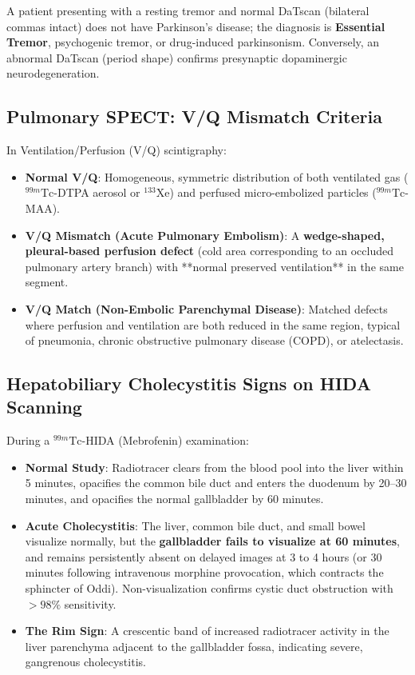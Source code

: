 \documentclass[11pt,a4paper]{article}
\begin{document}
\begin{clinicalpearl}
A patient presenting with a resting tremor and normal DaTscan (bilateral commas intact) does not have Parkinson's disease; the diagnosis is \textbf{Essential Tremor}, psychogenic tremor, or drug-induced parkinsonism. Conversely, an abnormal DaTscan (period shape) confirms presynaptic dopaminergic neurodegeneration.
\end{clinicalpearl}

\subsection{Pulmonary SPECT: V/Q Mismatch Criteria}
In Ventilation/Perfusion (V/Q) scintigraphy:
\begin{itemize}
    \item \textbf{Normal V/Q}: Homogeneous, symmetric distribution of both ventilated gas ($^{99m}\text{Tc}$-DTPA aerosol or $^{133}\text{Xe}$) and perfused micro-embolized particles ($^{99m}\text{Tc}$-MAA).
    \item \textbf{V/Q Mismatch (Acute Pulmonary Embolism)}: A \textbf{wedge-shaped, pleural-based perfusion defect} (cold area corresponding to an occluded pulmonary artery branch) with **normal preserved ventilation** in the same segment.
    \item \textbf{V/Q Match (Non-Embolic Parenchymal Disease)}: Matched defects where perfusion and ventilation are both reduced in the same region, typical of pneumonia, chronic obstructive pulmonary disease (COPD), or atelectasis.
\end{itemize}

\subsection{Hepatobiliary Cholecystitis Signs on HIDA Scanning}
During a $^{99m}\text{Tc}$-HIDA (Mebrofenin) examination:
\begin{itemize}
    \item \textbf{Normal Study}: Radiotracer clears from the blood pool into the liver within 5 minutes, opacifies the common bile duct and enters the duodenum by 20--30 minutes, and opacifies the normal gallbladder by 60 minutes.
    \item \textbf{Acute Cholecystitis}: The liver, common bile duct, and small bowel visualize normally, but the \textbf{gallbladder fails to visualize at 60 minutes}, and remains persistently absent on delayed images at 3 to 4 hours (or 30 minutes following intravenous morphine provocation, which contracts the sphincter of Oddi). Non-visualization confirms cystic duct obstruction with $>98\%$ sensitivity.
    \item \textbf{The Rim Sign}: A crescentic band of increased radiotracer activity in the liver parenchyma adjacent to the gallbladder fossa, indicating severe, gangrenous cholecystitis.
\end{itemize}
\end{document}
